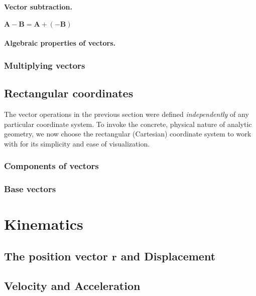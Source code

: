 \documentclass{article}
\numberwithin{theorem}{section}
\numberwithin{corollary}{section}
\numberwithin{postulate}{section}
\numberwithin{lemma}{section}
\theoremstyle{definition}
\numberwithin{definition}{section}
\theoremstyle{remark}
\renewcommand{\vec}[1]{\mathbf{#1}}
\begin{document}
\paragraph{Vector subtraction.} $\vec{A} - \vec{B} = \vec{A} + (- \vec{B})$

\paragraph{Algebraic properties of vectors.}

\subsubsection{Multiplying vectors}

\subsection{Rectangular coordinates}

The vector operations in the previous section were defined \emph{independently}
of any particular coordinate system. To invoke the concrete, physical nature of
analytic geometry, we now choose the rectangular (Cartesian) coordinate system
to work with for its simplicity and ease of visualization.

\subsubsection{Components of vectors}

\subsubsection{Base vectors}

\section{Kinematics}

\subsection{The position vector $\vec{r}$ and Displacement}

\subsection{Velocity and Acceleration}
\end{document}
